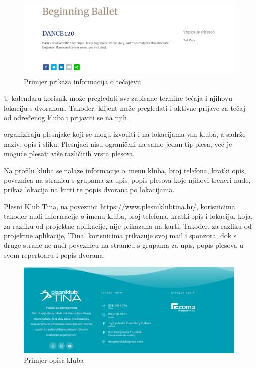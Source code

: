 \begin{figure}[H]
	\centering
	\includegraphics[scale=0.3]{slike/opis_2.png}
	\caption{Primjer prikaza informacija o tečajevu}
	\label{fig:screenshot002}
\end{figure}

U kalendaru korisnik može pregledati sve zapisane termine tečaja i njihovu lokaciju s dvoranom. Također, klijent može pregledati i aktivne prijave za tečaj od određenog kluba i prijaviti se na njih.

 organiziraju plesnjake koji se mogu izvoditi i na lokacijama van kluba, a sadrže naziv, opis i sliku. Plesnjaci nisu ograničeni na samo jedan tip plesa, već je moguće plesati više različitih vrsta plesova.

Na profilu kluba se nalaze informacije o imenu kluba, broj telefona, kratki opis, poveznica na stranicu s grupama za upis, popis plesova koje njihovi treneri nude, prikaz lokacija na karti te popis dvorana po lokacijama.

Plesni Klub Tina, na poveznici \url{https://www.plesniklubtina.hr/}, korisnicima također nudi informacije o imenu kluba, broj telefona, kratki opis i lokaciju, koja, za razliku od projektne aplikacije, nije prikazana na karti. Također, za razliku od projektne aplikacije, 'Tina' korisnicima prikazuje svoj mail i sponzora, dok s druge strane ne nudi poveznicu na stranicu s grupama za upis, popis plesova u svom repertoaru i popis dvorana.

\begin{figure}[H]
	\centering
	\includegraphics[scale=0.2]{slike/opis_3.png}
	\caption{Primjer opisa kluba}
	\label{fig:screenshot003}
\end{figure}

